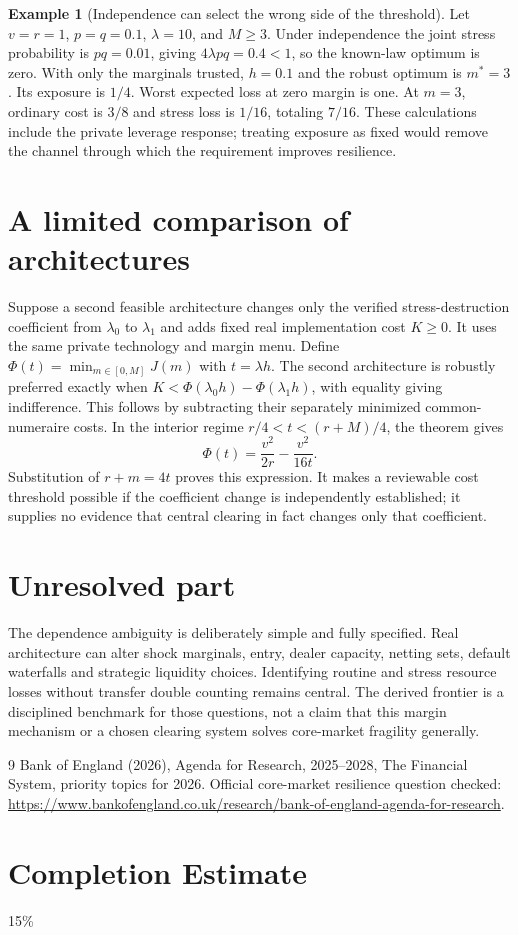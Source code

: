 \documentclass[11pt]{article}
\theoremstyle{definition}
\newtheorem{example}{Example}
\begin{document}
\begin{example}[Independence can select the wrong side of the threshold]
Let $v=r=1$, $p=q=0.1$, $\lambda=10$, and $M\geq3$. Under independence the joint stress probability is $pq=0.01$, giving $4\lambda pq=0.4<1$, so the known-law optimum is zero. With only the marginals trusted, $h=0.1$ and the robust optimum is $m^*=3$. Its exposure is $1/4$. Worst expected loss at zero margin is one. At $m=3$, ordinary cost is $3/8$ and stress loss is $1/16$, totaling $7/16$. These calculations include the private leverage response; treating exposure as fixed would remove the channel through which the requirement improves resilience.
\end{example}

\section*{A limited comparison of architectures}
Suppose a second feasible architecture changes only the verified stress-destruction coefficient from $\lambda_0$ to $\lambda_1$ and adds fixed real implementation cost $K\geq0$. It uses the same private technology and margin menu. Define $\Phi(t)=\min_{m\in[0,M]}J(m)$ with $t=\lambda h$. The second architecture is robustly preferred exactly when $K<\Phi(\lambda_0h)-\Phi(\lambda_1h)$, with equality giving indifference. This follows by subtracting their separately minimized common-numeraire costs. In the interior regime $r/4<t<(r+M)/4$, the theorem gives
\[
 \Phi(t)=\frac{v^2}{2r}-\frac{v^2}{16t}.
\]
Substitution of $r+m=4t$ proves this expression. It makes a reviewable cost threshold possible if the coefficient change is independently established; it supplies no evidence that central clearing in fact changes only that coefficient.

\section*{Unresolved part}
The dependence ambiguity is deliberately simple and fully specified. Real architecture can alter shock marginals, entry, dealer capacity, netting sets, default waterfalls and strategic liquidity choices. Identifying routine and stress resource losses without transfer double counting remains central. The derived frontier is a disciplined benchmark for those questions, not a claim that this margin mechanism or a chosen clearing system solves core-market fragility generally.
\begin{thebibliography}{9}
 Bank of England (2026), Agenda for Research, 2025--2028, The Financial System, priority topics for 2026. Official core-market resilience question checked: \url{https://www.bankofengland.co.uk/research/bank-of-england-agenda-for-research}.
\end{thebibliography}

\section{Completion Estimate}
15\%
\end{document}
